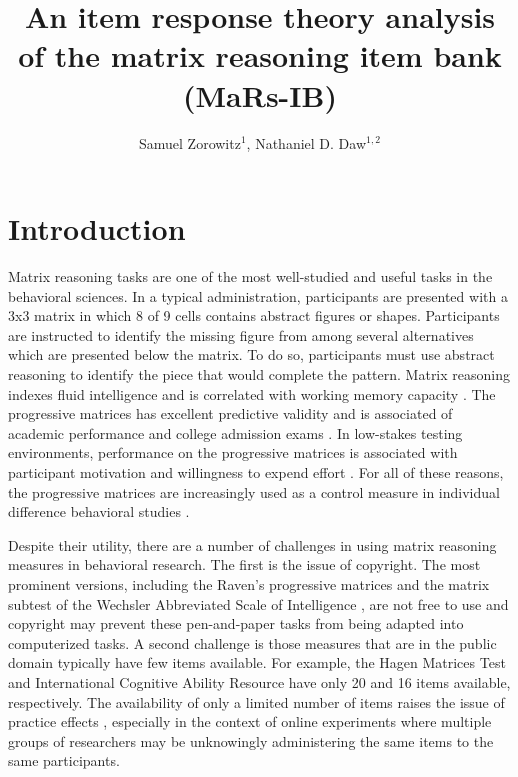 \documentclass[a4paper,man,natbib]{apa6}
\title{An item response theory analysis of the matrix reasoning item bank (MaRs-IB)}
\author{Samuel Zorowitz$^1$, Nathaniel D. Daw$^{1,2}$}
\affiliation{$^1$Princeton Neuroscience Institute, Princeton University, USA\\$^2$Department of Psychology, Princeton University, USA}
\begin{document}
\maketitle

\section{Introduction}

Matrix reasoning tasks are one of the most well-studied and useful tasks in the behavioral sciences. In a typical administration, participants are presented with a 3x3 matrix in which 8 of 9 cells contains abstract figures or shapes. Participants are instructed to identify the missing figure from among several alternatives which are presented below the matrix. To do so, participants must use abstract reasoning to identify the piece that would complete the pattern. Matrix reasoning indexes fluid intelligence and is correlated with working memory capacity \citep{conway2002latent, kane2004generality, unsworth2005working, salthouse2014relations}. The progressive matrices has excellent predictive validity and is associated of academic performance \citep{roth2015intelligence} and college admission exams \citep{frey2004scholastic, koenig2008act}. In low-stakes testing environments, performance on the progressive matrices is associated with participant motivation and willingness to expend effort \citep{gignac2018moderate, gignac2019maximum}. For all of these reasons, the progressive matrices are increasingly used as a control measure in individual difference behavioral studies \citep{gillan2016characterizing, rouault2018psychiatric, moutoussis2021decision}. 

Despite their utility, there are a number of challenges in using matrix reasoning measures in behavioral research. The first is the issue of copyright. The most prominent versions, including the Raven's progressive matrices \citep{raven2003raven} and the matrix subtest of the Wechsler Abbreviated Scale of Intelligence \citep{wechsler1999wechsler}, are not free to use and copyright may prevent these pen-and-paper tasks from being adapted into computerized tasks. A second challenge is those measures that are in the public domain typically have few items available. For example, the Hagen Matrices Test \citep{heydasch2014hagen} and International Cognitive Ability Resource \citep{condon2014international} have only 20 and 16 items available, respectively. The availability of only a limited number of items raises the issue of practice effects \citep{ng1974applicability, bors2003effect}, especially in the context of online experiments where multiple groups of researchers may be unknowingly administering the same items to the same participants.
\end{document}
